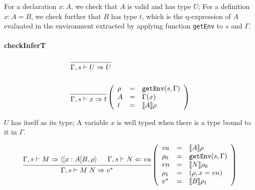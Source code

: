 \documentclass{article}
\theoremstyle{remark}
\begin{document}
For a declaration $x : A$, we check that $A$ is valid and has type $U$; For a definition $x : A = B$, we check further that $B$ has type $t$, which is the q-expression of $A$ evaluated in the environment extracted by applying function \texttt{getEnv} to $s$ and $\Gamma$. 

\paragraph{checkInferT}
\begin{align}
  &\begin{prooftree}
    \infer0{\Gamma,s \vdash U \Rightarrow U}
  \end{prooftree} \\
  \nonumber \\
  &\begin{prooftree}
    \infer0{\Gamma,s \vdash x \Rightarrow t}
  \end{prooftree}\left(\begin{array}{l l l}
                         \rho & = & \texttt{getEnv}(s, \Gamma) \\
                         A & = & \Gamma(x) \\
                         t & = & \llbracket A \rrbracket \rho
                       \end{array}\right)
\end{align}

$U$ has itself as its type; A variable $x$ is well typed when there is a type bound to it in $\Gamma$.

\begin{align}
  \begin{prooftree}
    \hypo{\Gamma,s \vdash M \Rightarrow \langle [x : A] B, \rho \rangle}
    \hypo{\Gamma,s \vdash N \Leftarrow va}
    \infer2{\Gamma,s \vdash M \; N \Rightarrow v^*}
  \end{prooftree}\left(\begin{array}{l l l}
                         va & = & \llbracket A \rrbracket \rho \\
                         \rho_0 &= & \texttt{getEnv}(s, \Gamma) \\
                         vn & = & \llbracket N \rrbracket \rho_0 \\
                         \rho_1 &= & (\rho, x = vn) \\
                         v^* & = & \llbracket B \rrbracket \rho_1
                       \end{array}\right)
\end{align}
\end{document}
